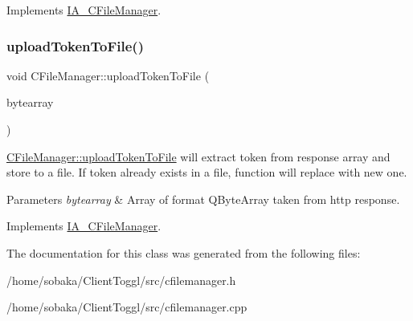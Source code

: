 Implements \hyperlink{classIA__CFileManager}{I\+A\+\_\+\+C\+File\+Manager}.

\mbox{\label{classCFileManager_a229c63a0823679b11e34d27f72b18b1b}} 
\subsubsection{\texorpdfstring{upload\+Token\+To\+File()}{uploadTokenToFile()}}
{\footnotesize\ttfamily void C\+File\+Manager\+::upload\+Token\+To\+File (\begin{DoxyParamCaption}\item[{Q\+Byte\+Array}]{bytearray }\end{DoxyParamCaption})\hspace{0.3cm}{\ttfamily [virtual]}}



\hyperlink{classCFileManager_a229c63a0823679b11e34d27f72b18b1b}{C\+File\+Manager\+::upload\+Token\+To\+File} will extract token from response array and store to a file. If token already exists in a file, function will replace with new one. 


\begin{DoxyParams}{Parameters}
{\em bytearray} & Array of format Q\+Byte\+Array taken from http response. \\
\hline
\end{DoxyParams}


Implements \hyperlink{classIA__CFileManager}{I\+A\+\_\+\+C\+File\+Manager}.



The documentation for this class was generated from the following files\+:\begin{DoxyCompactItemize}
\item 
/home/sobaka/\+Client\+Toggl/src/cfilemanager.\+h\item 
/home/sobaka/\+Client\+Toggl/src/cfilemanager.\+cpp\end{DoxyCompactItemize}
